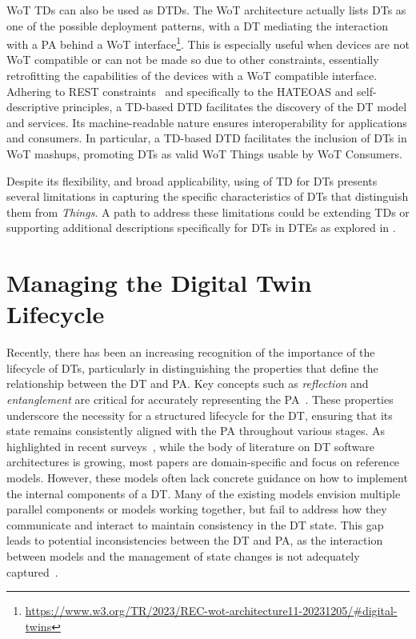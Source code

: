 \ac{WoT} \acp{TD} can also be used as \acp{DTD}.
The \ac{WoT} architecture actually lists \acp{DT} as one of the possible deployment patterns, with a \ac{DT} mediating the interaction with a \ac{PA} behind a \ac{WoT} interface\footnote{\url{https://www.w3.org/TR/2023/REC-wot-architecture11-20231205/\#digital-twins}}.
%
This is especially useful when devices are not \ac{WoT} compatible or can not be made so due to other constraints, essentially retrofitting the capabilities of the devices with a \ac{WoT} compatible interface.
%
Adhering to \ac{REST} constraints~\cite{fielding2000architectural} and specifically to the HATEOAS and self-descriptive principles, a \ac{TD}-based \ac{DTD} facilitates the discovery of the \ac{DT} model and services.
%
Its machine-readable nature ensures interoperability for applications and consumers.
%
In particular, a \ac{TD}-based \ac{DTD} facilitates the inclusion of \acp{DT} in \ac{WoT} mashups, promoting \acp{DT} as valid \ac{WoT} Things usable by \ac{WoT} Consumers.

Despite its flexibility,
and broad applicability, 
using of \ac{TD} for \acp{DT} presents several limitations in capturing the specific characteristics of \acp{DT} that distinguish them from \emph{Things}.
%
A path to address these limitations could be extending \acp{TD} or supporting additional descriptions specifically for \acp{DT} in \acp{DTE} as explored in .



\section{Managing the Digital Twin Lifecycle}


Recently, there has been an increasing recognition of the importance of the lifecycle of \acp{DT},
particularly in distinguishing the properties that define the relationship between the \ac{DT} and \ac{PA}. 
%
Key concepts such as \emph{reflection} and \emph{entanglement} are critical for accurately representing the \ac{PA}~\cite{dt-IoT-context-Minerva-2020,web-of-dt-ricci-2022}.
%
These properties underscore the necessity for a structured lifecycle for the \ac{DT}, ensuring that its state remains consistently aligned with the \ac{PA} throughout various stages.
%
As highlighted in recent surveys~\cite{ferko2022architecting, 9640612,Hribernik_Cabri_Mandreoli_Mentzas_2021}, while the body of literature on \ac{DT} software architectures is growing, most papers are domain-specific and focus on reference models.
%
However, these models often lack concrete guidance on how to implement the internal components of a \ac{DT}. Many of the existing models envision multiple parallel components or models working together, but fail to address how they communicate and interact to maintain consistency in the \ac{DT} state.
This gap leads to potential inconsistencies between the \ac{DT} and \ac{PA}, as the interaction between models and the management of state changes is not adequately captured~\cite{alam2017access,Malakuti2019fourlayer,Lpez2021}.


